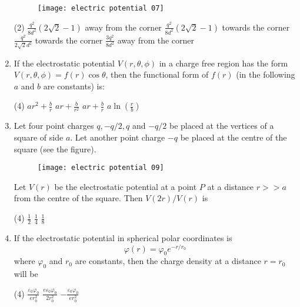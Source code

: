 \begin{enumerate}[label=\color{ocre}\textbf{\arabic*.}]
	{}
	\begin{figure}[H]
		\centering
		\texttt{[image: electric potential 07]}
	\end{figure}
	\begin{tasks}(2)
		\task[\textbf{A.}] $\frac{q^{2}}{8 d^{2}}(2 \sqrt{2}-1)$ away from the corner
		\task[\textbf{B.}] $\frac{q^{2}}{8 d^{2}}(2 \sqrt{2}-1)$ towards the corner
		\task[\textbf{C.}] $\frac{q^{2}}{2 \sqrt{2} d^{2}}$ towards the corner
		\task[\textbf{D.}] $\frac{3 q^{2}}{8 d^{2}}$ away from the corner
	\end{tasks}
	\item If the electrostatic potential $V(r, \theta, \phi)$ in a charge free region has the form $V(r, \theta, \phi)=f(r) \cos \theta$, then the functional form of $f(r)$ (in the following $a$ and $b$ are constants) is:
	{}
	\begin{tasks}(4)
		\task[\textbf{A.}] $a r^{2}+\frac{b}{r}$
		\task[\textbf{B.}] $a r+\frac{b}{r^{2}}$
		\task[\textbf{C.}] $a r+\frac{b}{r}$
		\task[\textbf{D.}] $a \ln \left(\frac{r}{b}\right)$
	\end{tasks}
	\item  Let four point charges $q,-q / 2, q$ and $-q / 2$ be placed at the vertices of a square of side $a$. Let another point charge $-q$ be placed at the centre of the square (see the figure).\\
	\begin{figure}[H]
		\centering
		\texttt{[image: electric potential 09]}
	\end{figure}
	Let $V(r)$ be the electrostatic potential at a point $P$ at a distance $r>>a$ from the centre of the square. Then $V(2 r) / V(r)$ is
	{}
	\begin{tasks}(4)
		\task[\textbf{B.}]  $\frac{1}{2}$
		\task[\textbf{C.}] $\frac{1}{4}$
		\task[\textbf{D.}] $\frac{1}{8}$
	\end{tasks}
	\item If the electrostatic potential in spherical polar coordinates is
	$$
	\varphi(r)=\varphi_{0} e^{-r / r_{0}}
	$$
	where $\varphi_{0}$ and $r_{0}$ are constants, then the charge density at a distance $r=r_{0}$ will be
	{}
	\begin{tasks}(4)
		\task[\textbf{A.}] $\frac{\varepsilon_{0} \varphi_{0}}{e r_{0}^{2}}$
		\task[\textbf{B.}] $\frac{e \varepsilon_{0} \varphi_{0}}{2 r_{0}^{2}}$
		\task[\textbf{C.}] $-\frac{\varepsilon_{0} \varphi_{0}}{e r_{0}^{2}}$

\end{tasks}
\end{enumerate}
